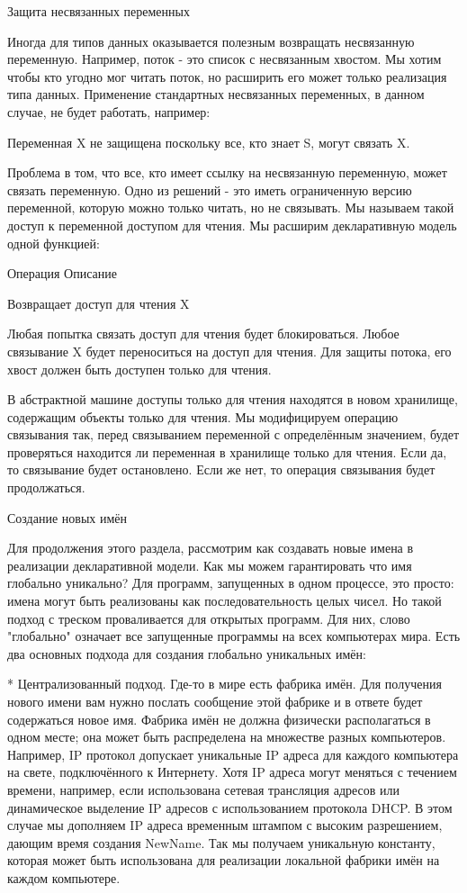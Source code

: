 Защита несвязанных переменных

Иногда для типов данных оказывается полезным возвращать несвязанную переменную. Например, поток - это список с несвязанным хвостом. Мы хотим чтобы кто угодно мог читать поток, но расширить его может только реализация типа данных. Применение стандартных несвязанных переменных, в данном случае, не будет работать, например: 

Переменная X не защищена поскольку все, кто знает S, могут связать X.

Проблема в том, что все, кто имеет ссылку на несвязанную переменную, может связать переменную. Одно из решений - это иметь ограниченную версию переменной, которую можно только читать, но не связывать. Мы называем такой доступ к переменной доступом для чтения. Мы расширим декларативную модель одной функцией:

Операция
Описание

Возвращает доступ для чтения X

Любая попытка связать доступ для чтения будет блокироваться. Любое связывание X будет переноситься на доступ для чтения. Для защиты потока, его хвост должен быть доступен только для чтения.

В абстрактной машине доступы только для чтения находятся в новом хранилище, содержащим объекты только для чтения. Мы модифицируем операцию связывания так, перед связыванием переменной с определённым значением, будет проверяться находится ли переменная в хранилище только для чтения. Если да, то связывание будет остановлено. Если же нет, то операция связывания будет продолжаться.

Создание новых имён

Для продолжения этого раздела, рассмотрим как создавать новые имена в реализации декларативной модели. Как мы можем гарантировать что имя глобально уникально? Для программ, запущенных в одном процессе, это просто: имена могут быть реализованы как последовательность целых чисел. Но такой подход с треском проваливается для открытых программ. Для них, слово "глобально" означает все запущенные программы на всех компьютерах мира. Есть два основных подхода для создания глобально уникальных имён:

* Централизованный подход. Где-то в мире есть фабрика имён. Для получения нового имени вам нужно послать сообщение этой фабрике и в ответе будет содержаться новое имя. Фабрика имён не должна физически располагаться в одном месте; она может быть распределена на множестве разных компьютеров. Например, IP протокол допускает уникальные IP адреса для каждого компьютера на свете, подключённого к Интернету. Хотя IP адреса могут меняться с течением времени, например, если использована сетевая трансляция адресов или динамическое выделение IP адресов с использованием протокола DHCP. В этом случае мы дополняем IP адреса временным штампом с высоким разрешением, дающим время создания NewName. Так мы получаем уникальную константу, которая может быть использована для реализации локальной фабрики имён на каждом компьютере.


